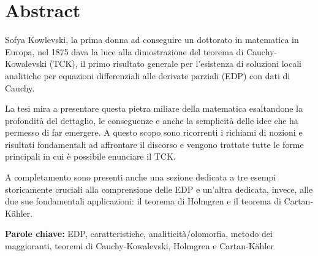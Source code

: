 \chapter*{Abstract}

Sofya Kowlevski, la prima donna ad conseguire un dottorato in matematica in Europa, nel 1875 dava la luce alla dimostrazione del teorema di Cauchy-Kowalevski (TCK), il primo risultato generale per l'esistenza di soluzioni locali analitiche per equazioni differenziali alle derivate parziali (EDP) con dati di Cauchy.

\vspace{6mm}
La tesi mira a presentare questa pietra miliare della matematica esaltandone la profondità del dettaglio, le conseguenze e anche la semplicità delle idee che ha permesso di far emergere. A questo scopo sono ricorrenti i richiami di nozioni e risultati fondamentali ad affrontare il discorso e vengono trattate tutte le forme principali in cui è possibile enunciare il TCK.

\vspace{6mm}
A completamento sono presenti anche una sezione dedicata a tre esempi storicamente cruciali alla comprensione delle EDP e un'altra dedicata, invece, alle due sue fondamentali applicazioni: il teorema di Holmgren e il teorema di Cartan-Kähler.

\vspace{6mm}
\textbf{Parole chiave:} EDP, caratteristiche, analiticità/olomorfia, metodo dei maggioranti, teoremi di Cauchy-Kowalevski, Holmgren e Cartan-Kähler

\newpage
\blankpage